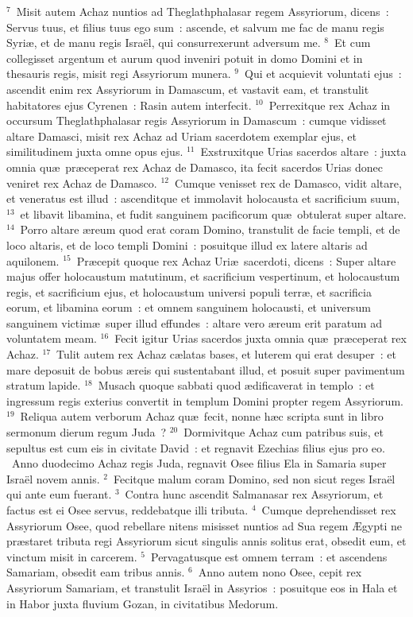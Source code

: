 ${}^{7}$~Misit autem Achaz nuntios ad Theglathphalasar regem Assyriorum, dicens~: Servus tuus, et filius tuus ego sum~: ascende, et salvum me fac de manu regis Syri\ae , et de manu regis Isra\"el, qui consurrexerunt adversum me.
${}^{8}$~Et cum collegisset argentum et aurum quod inveniri potuit in domo Domini et in thesauris regis, misit regi Assyriorum munera.
${}^{9}$~Qui et acquievit voluntati ejus~: ascendit enim rex Assyriorum in Damascum, et vastavit eam, et transtulit habitatores ejus Cyrenen~: Rasin autem interfecit.
${}^{10}$~Perrexitque rex Achaz in occursum Theglathphalasar regis Assyriorum in Damascum~: cumque vidisset altare Damasci, misit rex Achaz ad Uriam sacerdotem exemplar ejus, et similitudinem juxta omne opus ejus.
${}^{11}$~Exstruxitque Urias sacerdos altare~: juxta omnia qu\ae\ pr\ae ceperat rex Achaz de Damasco, ita fecit sacerdos Urias donec veniret rex Achaz de Damasco.
${}^{12}$~Cumque venisset rex de Damasco, vidit altare, et veneratus est illud~: ascenditque et immolavit holocausta et sacrificium suum,
${}^{13}$~et libavit libamina, et fudit sanguinem pacificorum qu\ae\ obtulerat super altare.
${}^{14}$~Porro altare \ae reum quod erat coram Domino, transtulit de facie templi, et de loco altaris, et de loco templi Domini~: posuitque illud ex latere altaris ad aquilonem.
${}^{15}$~Pr\ae cepit quoque rex Achaz Uri\ae\ sacerdoti, dicens~: Super altare majus offer holocaustum matutinum, et sacrificium vespertinum, et holocaustum regis, et sacrificium ejus, et holocaustum universi populi terr\ae , et sacrificia eorum, et libamina eorum~: et omnem sanguinem holocausti, et universum sanguinem victim\ae\ super illud effundes~: altare vero \ae reum erit paratum ad voluntatem meam.
${}^{16}$~Fecit igitur Urias sacerdos juxta omnia qu\ae\ pr\ae ceperat rex Achaz.
${}^{17}$~Tulit autem rex Achaz c\ae latas bases, et luterem qui erat desuper~: et mare deposuit de bobus \ae reis qui sustentabant illud, et posuit super pavimentum stratum lapide.
${}^{18}$~Musach quoque sabbati quod \ae dificaverat in templo~: et ingressum regis exterius convertit in templum Domini propter regem Assyriorum.
${}^{19}$~Reliqua autem verborum Achaz qu\ae\ fecit, nonne h\ae c scripta sunt in libro sermonum dierum regum Juda~?
${}^{20}$~Dormivitque Achaz cum patribus suis, et sepultus est cum eis in civitate David~: et regnavit Ezechias filius ejus pro eo.
~Anno duodecimo Achaz regis Juda, regnavit Osee filius Ela in Samaria super Isra\"el novem annis.
${}^{2}$~Fecitque malum coram Domino, sed non sicut reges Isra\"el qui ante eum fuerant.
${}^{3}$~Contra hunc ascendit Salmanasar rex Assyriorum, et factus est ei Osee servus, reddebatque illi tributa.
${}^{4}$~Cumque deprehendisset rex Assyriorum Osee, quod rebellare nitens misisset nuntios ad Sua regem \AE gypti ne pr\ae staret tributa regi Assyriorum sicut singulis annis solitus erat, obsedit eum, et vinctum misit in carcerem.
${}^{5}$~Pervagatusque est omnem terram~: et ascendens Samariam, obsedit eam tribus annis.
${}^{6}$~Anno autem nono Osee, cepit rex Assyriorum Samariam, et transtulit Isra\"el in Assyrios~: posuitque eos in Hala et in Habor juxta fluvium Gozan, in civitatibus Medorum.


